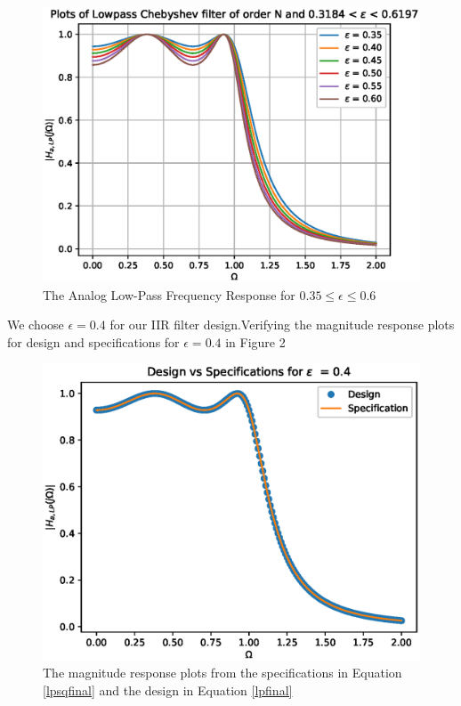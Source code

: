 \documentclass{article}
\begin{document}
\begin{enumerate}
\begin{figure}
\label{fig1}
\includegraphics[width = 15cm]{./codes/iir/figs/ee18btech11012_param_plots.eps}
\caption{The Analog Low-Pass Frequency Response for $0.35 \leq \epsilon \leq 0.6$}
\end{figure}
We choose $\epsilon = 0.4$  for our IIR filter design.Verifying the magnitude response plots for design and specifications for $\epsilon = 0.4$ in Figure 2
\begin{figure}
\label{fig2}
\includegraphics[width = 15cm]{./codes/iir/figs/ee18btech11012_specifications.eps}
\caption{The magnitude response plots from the specifications in Equation \ref{lpsqfinal} and the design in Equation \ref{lpfinal}}
\end{figure} 


\end{enumerate}
\end{document}
